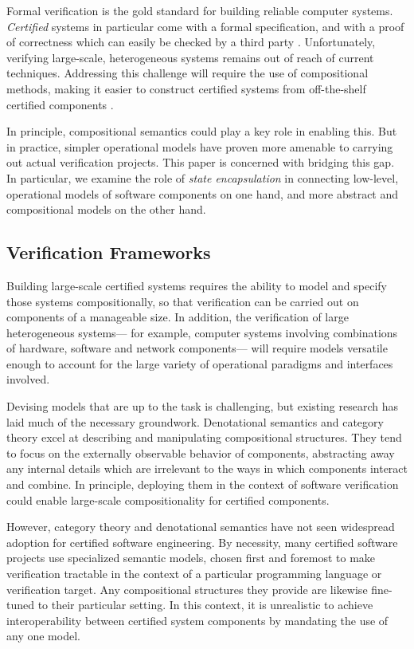 \documentclass[acmsmall,screen,review,anonymous]{acmart}
\begin{document}
Formal verification is the gold standard
for building reliable computer systems.
\emph{Certified} systems in particular
come with a formal specification,
and with a proof of correctness
which can easily be checked by a third party
\cite{shao10}.
Unfortunately, verifying large-scale, heterogeneous systems
remains out of reach of current techniques.
Addressing this challenge
will require the use of compositional methods,
making it easier to construct certified systems
from off-the-shelf certified components
\cite{deepspec}.

In principle,
compositional semantics
could play a key role in enabling this.
But in practice, simpler operational models
have proven more amenable
to carrying out actual verification projects.
This paper is concerned with bridging this gap.
In particular,
we examine the role of \emph{state encapsulation}
in connecting low-level, operational models
of software components on one hand,
and more abstract and compositional models
on the other hand.


\subsection{Verification Frameworks} \label{sec:intro:bigpict} %

Building large-scale certified systems
requires the ability
to model and specify those systems compositionally,
so that verification can be carried out
on components of a manageable size.
In addition,
the verification of large heterogeneous systems---%
for example,
computer systems involving combinations of
hardware, software and network components---%
will require models versatile enough
to account for the large variety of
operational paradigms and interfaces involved.

Devising models that are up to the task is challenging,
but existing research has laid much of the necessary groundwork.
Denotational semantics and category theory
excel at describing and manipulating compositional structures.
They tend to focus on the externally observable behavior of components,
abstracting away any internal details which are irrelevant
to the ways in which components interact and combine.
In principle,
deploying them in the context of software verification
could enable large-scale compositionality
for certified components.

However,
category theory and denotational semantics
have not seen widespread adoption
for certified software engineering.
By necessity,
many certified software projects use
specialized semantic models,
chosen first and foremost
to make verification tractable
in the context of a particular
programming language or verification target.
Any compositional structures they provide
are likewise fine-tuned to their particular setting.
In this context,
it is unrealistic to achieve interoperability between
certified system components
by mandating the use of any one model.
\end{document}
